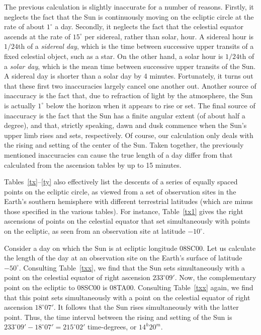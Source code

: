  The previous calculation is slightly inaccurate for a number of reasons. Firstly, it neglects the
 fact that the Sun is continuously  moving  on the ecliptic circle at the rate of about $1^\circ$ a day.
 Secondly, it neglects the fact that the celestial equator ascends
 at the rate of $15^\circ$ per  sidereal, rather than 
 solar, hour. A sidereal hour is $1/24$th of a {\em sidereal day},
 which is the time between successive upper transits  of a fixed celestial object, such as a star. On the other hand, a solar hour is $1/24$th of a
 {\em solar day}, which is the mean time between successive upper transits
 of the Sun. A sidereal day is shorter than a solar day by 4 minutes. 
 Fortunately, it turns out that these first two inaccuracies largely
 cancel one another out. Another source of inaccuracy is the fact that, due to
 refraction of light by the atmosphere, the Sun is actually $1^\circ$ below
 the horizon when it appears to rise or set. The final source of inaccuracy
 is the fact that the Sun has a finite angular extent (of about half a degree),
 and that, strictly speaking, dawn and dusk commence when the Sun's upper limb rises and sets, respectively. Of course, our calculation
 only deals  with the rising and setting of the center of the Sun. 
 Taken together, the previously mentioned inaccuracies can cause  the true length
 of a day differ from that calculated from the ascension tables by up
 to 15 minutes.
 
 Tables~\ref{tx}--\ref{ty} also effectively list the  descents of a series of equally spaced points on the ecliptic
circle, as viewed from a set of observation sites in the Earth's  southern 
hemisphere with different terrestrial latitudes (which are minus those specified in the various tables). For instance,
Table~\ref{tx1} gives the right ascensions of points on the celestial equator that  set simultaneously
with points on the ecliptic, as seen from an observation site at latitude $-10^\circ$. 

Consider a day on which the Sun is at ecliptic longitude 08SC00. Let us calculate the length of the day
at an observation site on the Earth's surface of latitude $-50^\circ$. Consulting Table~\ref{txx}, we find that
the Sun sets simultaneously with a point on the celestial equator of right ascension $233^\circ 09'$. Now,
the complementary point on the ecliptic to 08SC00 is 08TA00. Consulting Table~\ref{txx} again, we
find that this point sets simultaneously with a point on the celestial equator of
right ascension $18^\circ 07'$. It follows that the Sun rises simultaneously with the latter point. 
Thus, the time interval between the rising and setting of the Sun is $233^\circ 09'-18^\circ 07'=215^\circ 02'$
time-degrees, or $14^h 20^m$. 
 
